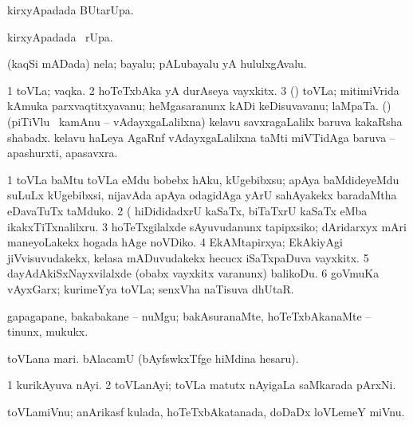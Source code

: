 \bentry
{} 
\gl{\kirx}
\expl{}
\bmng
{} kirxyApadada BUtarUpa. 
\emng
\eentry

\bentry
{} 
\gl{\kirx}
\expl{}
\bmng
{} kirxyApadada \BUkaq\ rUpa. 
\emng
\eentry

\bentry
{} 
\gl{\nA}
\expl{}
\bmng
(kaqSi mADada) nela; bayalu; pALubayalu yA hululxgAvalu. 
\emng
\eentry

\bentry
{} 
\gl{\nA}
\bmng
\bnum
\num{1} toVLa; vaqka. 
\num{2} hoTeTxbAka yA durAseya vayxkitx. 
\num{3} (\ashi) toVLa; mitimiVrida kAmuka parxvaqtitxyavanu; heMgasaranunx kADi keDisuvavanu; laMpaTa. 
 (\saM) 
\banum
{} (piTiVlu \mo\ kamAnu -- vAdayxgaLalilxna) kelavu savxragaLalilx baruva kakaRsha shabadx. 
 kelavu haLeya AgaRnf vAdayxgaLalilxna taMti miVTidAga baruva -- apashurxti, apasavxra. 
\eanum
\numie
\enum
\emng

\noindent
\gl{\pagu}
\expl{}
\bmng
\bnum
\num{1}  toVLa baMtu toVLa eMdu bobebx hAku, kUgebibxsu; apAya baMdideyeMdu suLuLx kUgebibxsi, nijavAda apAya odagidAga yArU sahAyakekx baradaMtha eDavaTuTx taMduko. 
\num{2}  (  hiDididadxrU kaSaTx, biTaTxrU kaSaTx eMba ikakxTiTxnalilxru. 
\num{3}  hoTeTxgilalxde sAyuvudanunx tapipxsiko; dAridarxyx mAri maneyoLakekx hogada hAge noVDiko. 
\num{4}  EkAMtapirxya; EkAkiyAgi jiVvisuvudakekx, kelasa mADuvudakekx hecucx iSaTxpaDuva vayxkitx. 
\num{5}  dayAdAkiSxNayxvilalxde (obabx vayxkitx \mo varanunx) balikoDu. 
\num{6}  goVmuKa vAyxGarx; kurimeYya toVLa; senxVha naTisuva dhUtaR. 
\enum
\emng
\eentry

\bentry
{} 
\gl{\sakirx}
\expl{}
\bmng
gapagapane, bakabakane -- nuMgu; bakAsuranaMte, hoTeTxbAkanaMte -- tinunx, mukukx. 
\emng
\eentry

\bentry
{} 
\gl{\nA}
\expl{}
\bmng
\banum
{} toVLana mari. 
 bAlacamU (bAyfswkxTfge hiMdina hesaru). 
\eanum
\emng
\eentry

\bentry
{} 
\gl{\nA}
\expl{}
\bmng
\bnum
\num{1} kurikAyuva nAyi. 
\num{2} toVLanAyi; toVLa matutx nAyigaLa saMkarada pArxNi. 
\enum
\emng
\eentry

\bentry
{} 
\gl{\nA}
\expl{}
\bmng
toVLamiVnu; anArikasf kulada, hoTeTxbAkatanada, doDaDx loVLemeY miVnu. 
\emng
\eentry

